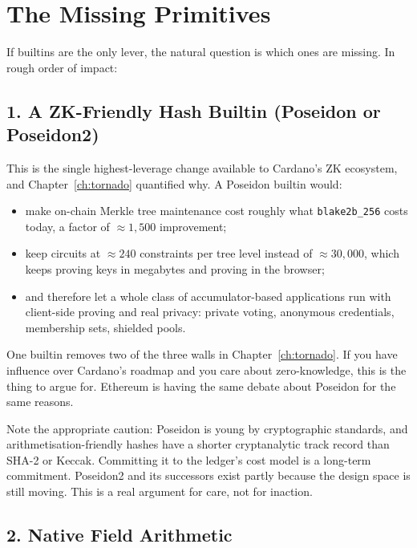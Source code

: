 \section{The Missing Primitives} \label{sec:ch9-missing}

If builtins are the only lever, the natural question is which ones are missing.
In rough order of impact:

\subsection*{1. A ZK-Friendly Hash Builtin (Poseidon or Poseidon2)}

This is the single highest-leverage change available to Cardano's ZK ecosystem,
and Chapter~\ref{ch:tornado} quantified why. A Poseidon builtin would:

\begin{itemize}
  \item make on-chain Merkle tree maintenance cost roughly what
        \texttt{blake2b\_256} costs today, a factor of $\approx 1{,}500$
        improvement;
  \item keep circuits at $\approx 240$ constraints per tree level instead of
        $\approx 30{,}000$, which keeps proving keys in megabytes and proving in
        the browser;
  \item and therefore let a whole class of accumulator-based applications run
        with client-side proving and real privacy: private voting, anonymous
        credentials, membership sets, shielded pools.
\end{itemize}

\begin{highlight}
One builtin removes two of the three walls in Chapter~\ref{ch:tornado}. If you
have influence over Cardano's roadmap and you care about zero-knowledge, this is
the thing to argue for. Ethereum is having the same debate about Poseidon for
the same reasons.
\end{highlight}

Note the appropriate caution: Poseidon is young by cryptographic standards, and
arithmetisation-friendly hashes have a shorter cryptanalytic track record than
SHA-2 or Keccak. Committing it to the ledger's cost model is a long-term
commitment. Poseidon2 and its successors exist partly because the design space
is still moving. This is a real argument for care, not for inaction.

\subsection*{2. Native Field Arithmetic}


